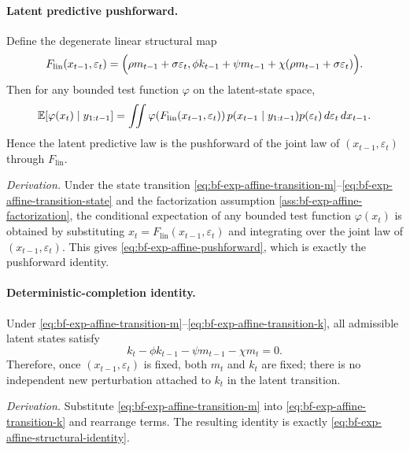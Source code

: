 \paragraph{Latent predictive pushforward.}
\label{lem:bf-exp-affine-latent-pushforward}
Define the degenerate linear structural map
\begin{equation}
  F_{\mathrm{lin}}(x_{t-1},\varepsilon_t)
  =
  \Bigl(
    \rho m_{t-1}+\sigma\varepsilon_t,
    \phi k_{t-1}+\psi m_{t-1}+\chi(\rho m_{t-1}+\sigma\varepsilon_t)
  \Bigr).
  \label{eq:bf-exp-affine-latent-map}
\end{equation}
Then for any bounded test function $\varphi$ on the latent-state space,
\begin{equation}
  \mathbb{E}\!\left[\varphi(x_t)\mid y_{1:t-1}\right]
  =
  \iint
  \varphi\!\left(F_{\mathrm{lin}}(x_{t-1},\varepsilon_t)\right)
  p(x_{t-1}\mid y_{1:t-1})p(\varepsilon_t)
  \, d\varepsilon_t \, dx_{t-1}.
  \label{eq:bf-exp-affine-pushforward}
\end{equation}
Hence the latent predictive law is the pushforward of the joint law of
$(x_{t-1},\varepsilon_t)$ through $F_{\mathrm{lin}}$.

\emph{Derivation.}
Under the state transition
\eqref{eq:bf-exp-affine-transition-m}--\eqref{eq:bf-exp-affine-transition-state}
and the factorization assumption
\eqref{ass:bf-exp-affine-factorization}, the conditional expectation of any
bounded test function $\varphi(x_t)$ is obtained by substituting
$x_t=F_{\mathrm{lin}}(x_{t-1},\varepsilon_t)$ and integrating over the joint law
of $(x_{t-1},\varepsilon_t)$.  This gives
\eqref{eq:bf-exp-affine-pushforward}, which is exactly the pushforward identity.

\paragraph{Deterministic-completion identity.}
\label{lem:bf-exp-affine-deterministic-completion}
Under \eqref{eq:bf-exp-affine-transition-m}--\eqref{eq:bf-exp-affine-transition-k},
all admissible latent states satisfy
\begin{equation}
  k_t - \phi k_{t-1} - \psi m_{t-1} - \chi m_t = 0.
  \label{eq:bf-exp-affine-structural-identity}
\end{equation}
Therefore, once $(x_{t-1},\varepsilon_t)$ is fixed, both $m_t$ and $k_t$ are
fixed; there is no independent new perturbation attached to $k_t$ in the latent
transition.

\emph{Derivation.}
Substitute \eqref{eq:bf-exp-affine-transition-m} into
\eqref{eq:bf-exp-affine-transition-k} and rearrange terms.  The resulting
identity is exactly \eqref{eq:bf-exp-affine-structural-identity}.

